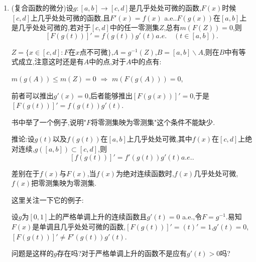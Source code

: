 \documentclass[12pt,a4paper,openany]{book}
\begin{document}
\begin{enumerate}
(ii)$B_n=\{x \in E: |y-x|<1/n,|f(y)-f(x)|\ge\frac{|y-x|}{n}\}$,$B=\bigcup{B_n}=\{x \in E: |f'(x)|>0\}$.

$I$为任一长度小于$1/n$的区间,$A=I\cap B_n \subset E$,可以得出$m(f(A))=0$.

$\forall \epsilon>0$,$\exists \{I_k\}$,$\bigcup{I_k} \supset f(A)$,$\sum{|I_k|}<\epsilon$.

$A_k=A \cap f^{-1}(I_k)$,$A_k \subset A$,$A_k \subset I \cap B_n$,$f(A_k) \subset I_k$,

$\bigcup{A_k}=\bigcup{A\cap f^{-1}(I_k)}=A \cap (\bigcup{f^{-1}(I_k)}) = A$,$A \subset \bigcup{f^{-1}(I_k)}$.

$m^*(A) \le \sum{m^*(A_k)} \le \sum{\text{diam}(A_k)} \le \sum{n \cdot \text{diam}(f(A_k))} \le n\sum{m(I_k)} \le n\epsilon$.

这一步师什么原因?这是从$B_n$的定义得出的,$A_k \subset B_n$

$|y-x| \le n|f(y)-f(x)|$,可以得出$\sup{|y-x|} \le n \sup{|f(y)-f(x)|}$.

\item (复合函数的微分)设$g:[a,b]\rightarrow [c,d]$是几乎处处可微的函数,$F(x)$时候$[c,d]$上几乎处处可微的函数,且$F'(x)=f(x)$ a.e..$F(g(x))$在$[a,b]$上是几乎处处可微的,若对于$[c,d]$中的任一零测集$Z$,总有$m(F(Z))=0$,则
\[
[F(g(t))]'=f(g(t))g'(t) a.e. \quad (t \in [a,b]).
\]

$Z = \{x \in [c,d]: F\text{在}x\text{点不可微}\}$,$A=g^{-1}(Z)$,$B=[a,b]\backslash A$,则在$B$中有等式成立,注意这时还是有$A$中的点,对于$A$中的点有:

$m(g(A)) \le m(Z) = 0$ $\Rightarrow$ $m(F(g(A)))=0$,

前者可以推出$g'(x)=0$,后者能够推出$[F(g(x))]'=0$,于是$[F(g(t))]'=f(g(t))g'(t)$.

书中举了一个例子,说明"$F$将零测集映为零测集"这个条件不能缺少.

推论:设$g(t)$以及$f(g(t))$在$[a,b]$上几乎处处可微,其中$f(x)$在$[c,d]$上绝对连续,$g([a,b]) \subset [c,d]$,则
\[
[f(g(t))]'=f'(g(t))g'(t) a.e..
\]

差别在于$f(x)$与$F(x)$,当$f(x)$为绝对连续函数时,$f(x)$几乎处处可微,$f(x)$把零测集映为零测集.

这里关注一下它的例子:

设$g$为$[0,1]$上的严格单调上升的连续函数且$g'(t)=0$ a.e.,令$F=g^{-1}$.易知$F(x)$是单调且几乎处处可微的函数,$[F(g(t))]'=(t)'=1$,$g'(t)=0$,$[F(g(t))]' \neq F'(g(t))g'(t)$.

问题是这样的$g$存在吗?对于严格单调上升的函数不是应有$g'(t)>0$吗?


\end{enumerate}
\end{document}
